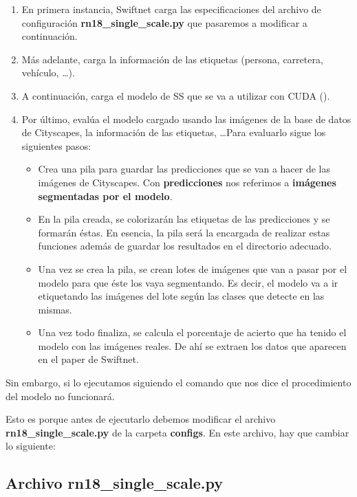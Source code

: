 \begin{enumerate}
\item En primera instancia, Swiftnet carga las especificaciones del archivo de configuración \textbf{rn18\_single\_scale.py} que pasaremos a modificar a continuación.
\item Más adelante, carga la información de las etiquetas (persona, carretera, vehículo, \ldots).
\item A continuación, carga el modelo de \ac{SS} que se va a utilizar con CUDA (\cite{cuda}).
\item Por último, evalúa el modelo cargado usando las imágenes de la base de datos de Cityscapes, la información de las etiquetas, \ldots  Para evaluarlo sigue los siguientes pasos:

\begin{itemize}
\item Crea una pila para guardar las predicciones que se van a hacer de las imágenes de Cityscapes. Con \textbf{predicciones} nos referimos a \textbf{imágenes segmentadas por el modelo}.
\item En la pila creada, se colorizarán las etiquetas de las predicciones y se formarán éstas. En esencia, la pila será la encargada de realizar estas funciones además de guardar los resultados en el directorio adecuado.
\item Una vez se crea la pila, se crean lotes de imágenes que van a pasar por el modelo para que éste los vaya segmentando. Es decir, el modelo va a ir etiquetando las imágenes del lote según las clases que detecte en las mismas.
\item Una vez todo finaliza, se calcula el porcentaje de acierto que ha tenido el modelo con las imágenes reales. De ahí se extraen los datos que aparecen en el paper de Swiftnet.
\end{itemize}   
\end{enumerate}
Sin embargo, si lo ejecutamos siguiendo el comando que nos dice el procedimiento del modelo no funcionará.

Esto es porque antes de ejecutarlo debemos modificar el archivo \textbf{rn18\_single\_scale.py} de la carpeta \textbf{configs}. En este archivo, hay que cambiar lo siguiente:

\subsection{Archivo rn18\_single\_scale.py}


